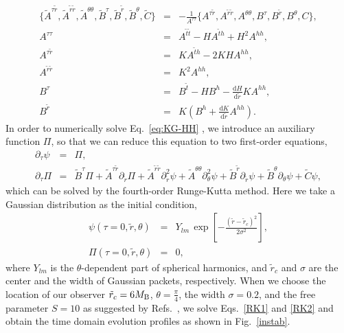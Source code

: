 \documentclass[12pt]{article}
\begin{document}
\begin{eqnarray}
\{{\tilde A}^{\tau {\tilde r}},
{\tilde A}^{{\tilde r}{\tilde r}},
{\tilde A}^{\theta\theta},
{\tilde B}^{\tau},
{\tilde B}^{\tilde r},
{\tilde B}^\theta,
{\tilde C}\}
&=&-\frac 1{A^{\tau\tau}}
\{{A}^{\tau {\tilde r}},
{A}^{{\tilde r}{\tilde r}},
{A}^{\theta\theta},
{B}^{\tau},
{B}^{\tilde r},
{B}^\theta,
{C}\},\nonumber\\
A^{\tau\tau}&=&A^{\tilde t\tilde t}-HA^{\tilde t h}+H^2A^{hh},\nonumber\\
A^{\tau {\tilde r}}&=&KA^{\tilde t h}-2KHA^{hh},\nonumber\\
A^{{\tilde r}{\tilde r}}&=&K^2A^{hh},\nonumber\\
B^\tau&=&B^{\tilde t}-HB^h-\frac{\mathrm dH}{\mathrm d {\tilde r}}KA^{hh}, \nonumber\\
B^{\tilde r}&=&K\left(B^h+ \frac{\mathrm dK}{\mathrm d {\tilde r}}A^{hh}\right).\label{HHH}
\end{eqnarray}
In order to numerically solve Eq.~\eqref{eq:KG-HH} , we introduce an auxiliary function $\Pi$, so that we can reduce this equation to two first-order equations,
\begin{eqnarray}
\partial_\tau \psi&=&\Pi,\label{RK1}\\
\partial_\tau \Pi&=&{\tilde B}^{\tau}\Pi
+{\tilde A}^{\tau {\tilde r}}\partial_{\tilde r}\Pi
+{\tilde A}^{{\tilde r}{\tilde r}}\partial^2_{\tilde r}\psi
+{\tilde A}^{\theta\theta}\partial^2_\theta\psi
+{\tilde B}^{\tilde r}\partial_{\tilde r}\psi
+{\tilde B}^\theta\partial_\theta\psi
+{\tilde C}\psi,\label{RK2}
\end{eqnarray}
which can be solved by the fourth-order Runge-Kutta method. 
Here we take a Gaussian distribution as the initial condition,
\begin{eqnarray}
\psi(\tau=0,{\tilde r},\theta)&=&Y_{lm}\,{\exp}\left[-\frac{({\tilde r}-{\tilde r}_c)^2}{2\sigma^2}\right],\nonumber \\
\Pi(\tau=0,{\tilde r},\theta)&=&0,
\end{eqnarray}
where $Y_{lm}$ is the $\theta$-dependent part of spherical harmonics, and $\tilde r_c$ and $\sigma$ are the center and the width of Gaussian packets, respectively. When we choose the location of our observer $\tilde r_c = 6M_{\rm B}$, $\theta=\frac{\pi}{4}$,
 the width $\sigma=0.2$, and the free parameter $S=10$ as suggested by Refs.~\cite{Harms:2014dqa,zhang2020object},  we solve Eqs.~\eqref{RK1} and \eqref{RK2} and obtain the time domain evolution profiles as shown in Fig.~\ref{instab}.
\end{document}

